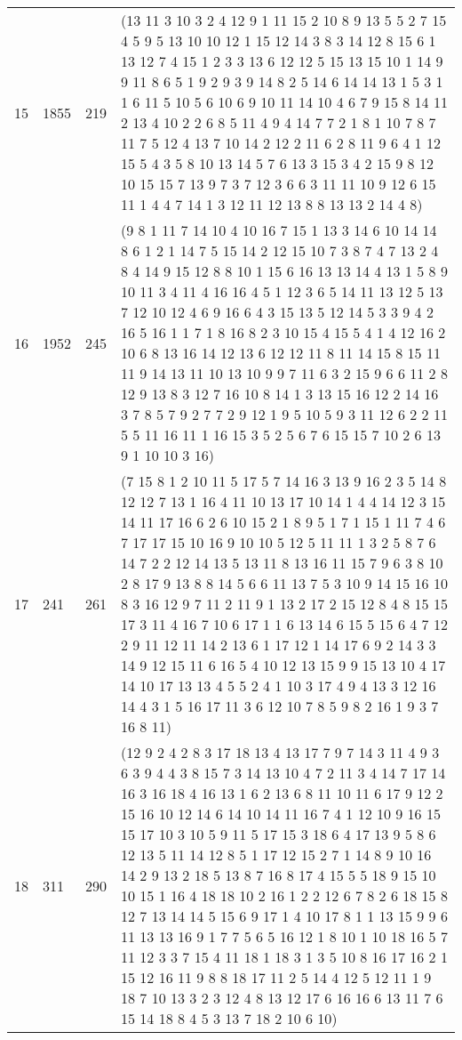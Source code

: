 \begin{table}
\begin{tabularx}{\textwidth}{| X | X | X | p{13cm} |}
15 & 1855 & 219 & (13 11 3 10 3 2 4 12 9 1 11 15 2 10 8 9 13 5 5 2 7 15 4 5 9 5 13 10 10 12 1 15 12 14 3 8 3 14 12 8 15 6 1 13 12 7 4 15 1 2 3 3 13 6 12 12 5 15 13 15 10 1 14 9 9 11 8 6 5 1 9 2 9 3 9 14 8 2 5 14 6 14 14 13 1 5 3 1 1 6 11 5 10 5 6 10 6 9 10 11 14 10 4 6 7 9 15 8 14 11 2 13 4 10 2 2 6 8 5 11 4 9 4 14 7 7 2 1 8 1 10 7 8 7 11 7 5 12 4 13 7 10 14 2 12 2 11 6 2 8 11 9 6 4 1 12 15 5 4 3 5 8 10 13 14 5 7 6 13 3 15 3 4 2 15 9 8 12 10 15 15 7 13 9 7 3 7 12 3 6 6 3 11 11 10 9 12 6 15 11 1 4 4 7 14 1 3 12 11 12 13 8 8 13 13 2 14 4 8) \\
16 & 1952 & 245 & (9 8 1 11 7 14 10 4 10 16 7 15 1 13 3 14 6 10 14 14 8 6 1 2 1 14 7 5 15 14 2 12 15 10 7 3 8 7 4 7 13 2 4 8 4 14 9 15 12 8 8 10 1 15 6 16 13 13 14 4 13 1 5 8 9 10 11 3 4 11 4 16 16 4 5 1 12 3 6 5 14 11 13 12 5 13 7 12 10 12 4 6 9 16 6 4 3 15 13 5 12 14 5 3 3 9 4 2 16 5 16 1 1 7 1 8 16 8 2 3 10 15 4 15 5 4 1 4 12 16 2 10 6 8 13 16 14 12 13 6 12 12 11 8 11 14 15 8 15 11 11 9 14 13 11 10 13 10 9 9 7 11 6 3 2 15 9 6 6 11 2 8 12 9 13 8 3 12 7 16 10 8 14 1 3 13 15 16 12 2 14 16 3 7 8 5 7 9 2 7 7 2 9 12 1 9 5 10 5 9 3 11 12 6 2 2 11 5 5 11 16 11 1 16 15 3 5 2 5 6 7 6 15 15 7 10 2 6 13 9 1 10 10 3 16) \\
17 & 241 & 261 & (7 15 8 1 2 10 11 5 17 5 7 14 16 3 13 9 16 2 3 5 14 8 12 12 7 13 1 16 4 11 10 13 17 10 14 1 4 4 14 12 3 15 14 11 17 16 6 2 6 10 15 2 1 8 9 5 1 7 1 15 1 11 7 4 6 7 17 17 15 10 16 9 10 10 5 12 5 11 11 1 3 2 5 8 7 6 14 7 2 2 12 14 13 5 13 11 8 13 16 11 15 7 9 6 3 8 10 2 8 17 9 13 8 8 14 5 6 6 11 13 7 5 3 10 9 14 15 16 10 8 3 16 12 9 7 11 2 11 9 1 13 2 17 2 15 12 8 4 8 15 15 17 3 11 4 16 7 10 6 17 1 1 6 13 14 6 15 5 15 6 4 7 12 2 9 11 12 11 14 2 13 6 1 17 12 1 14 17 6 9 2 14 3 3 14 9 12 15 11 6 16 5 4 10 12 13 15 9 9 15 13 10 4 17 14 10 17 13 13 4 5 5 2 4 1 10 3 17 4 9 4 13 3 12 16 14 4 3 1 5 16 17 11 3 6 12 10 7 8 5 9 8 2 16 1 9 3 7 16 8 11) \\
18 & 311 & 290 & (12 9 2 4 2 8 3 17 18 13 4 13 17 7 9 7 14 3 11 4 9 3 6 3 9 4 4 3 8 15 7 3 14 13 10 4 7 2 11 3 4 14 7 17 14 16 3 16 18 4 16 13 1 6 2 13 6 8 11 10 11 6 17 9 12 2 15 16 10 12 14 6 14 10 14 11 16 7 4 1 12 10 9 16 15 15 17 10 3 10 5 9 11 5 17 15 3 18 6 4 17 13 9 5 8 6 12 13 5 11 14 12 8 5 1 17 12 15 2 7 1 14 8 9 10 16 14 2 9 13 2 18 5 13 8 7 16 8 17 4 15 5 5 18 9 15 10 10 15 1 16 4 18 18 10 2 16 1 2 2 12 6 7 8 2 6 18 15 8 12 7 13 14 14 5 15 6 9 17 1 4 10 17 8 1 1 13 15 9 9 6 11 13 13 16 9 1 7 7 5 6 5 16 12 1 8 10 1 10 18 16 5 7 11 12 3 3 7 15 4 11 18 1 18 3 1 3 5 10 8 16 17 16 2 1 15 12 16 11 9 8 8 18 17 11 2 5 14 4 12 5 12 11 1 9 18 7 10 13 3 2 3 12 4 8 13 12 17 6 16 16 6 13 11 7 6 15 14 18 8 4 5 3 13 7 18 2 10 6 10) \\

\end{tabularx}
\end{table}
